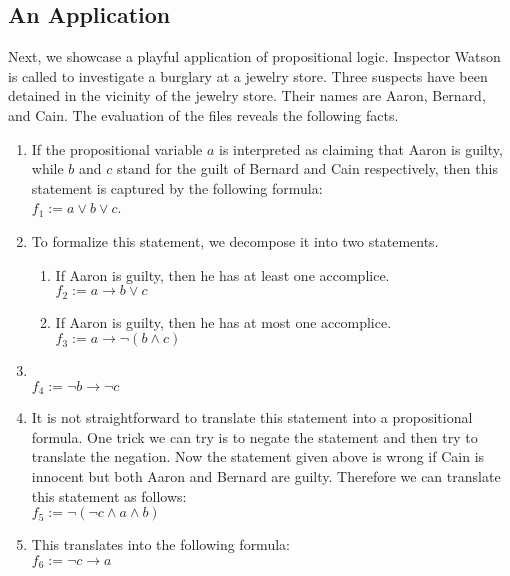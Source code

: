 \subsection{An Application}
Next, we showcase a playful application of propositional logic.  Inspector Watson is called to investigate a
burglary at a jewelry store.  Three suspects have been detained in the vicinity of the jewelry store.
Their names are Aaron, Bernard, and Cain.  The evaluation of the files reveals the following facts.
\begin{enumerate}
\item {}

      If the propositional variable $a$ is interpreted as claiming that Aaron is guilty, while $b$ and $c$
      stand for the guilt of Bernard and Cain respectively, then this statement is captured by the following formula: 
      \\[0.2cm]
      \hspace*{1.3cm} 
      $f_1 := a \vee b \vee c$.
\item {}
      
      To formalize this statement, we decompose it into two statements.
      \begin{enumerate}
      \item If Aaron is guilty, then he has at least one accomplice. \\[0.2cm]
            \hspace*{1.3cm} $f_2 := a \rightarrow b \vee c$ 
      \item If Aaron is guilty, then he has at most one accomplice. \\[0.2cm]
           \hspace*{1.3cm} $f_3 := a \rightarrow \neg (b \wedge c)$
      \end{enumerate}
\item {} \\[0.2cm]
      \hspace*{1.3cm} $f_4 :=  \neg b \rightarrow \neg c$ 
\item {}

      It is not straightforward to translate this statement into a propositional formula.
      One trick we can try is to negate the statement and then try to translate the negation.
      Now the statement given above is wrong if Cain is innocent but both Aaron and Bernard are guilty.
      Therefore we can translate this statement as follows: \\[0.2cm]
      \hspace*{1.3cm} $f_5 := \neg ( \neg c  \wedge a \wedge b )$ 
\item {} 

      This translates into the following formula:\\[0.2cm]
      \hspace*{1.3cm} $f_6 := \neg c \rightarrow a$
\end{enumerate}

